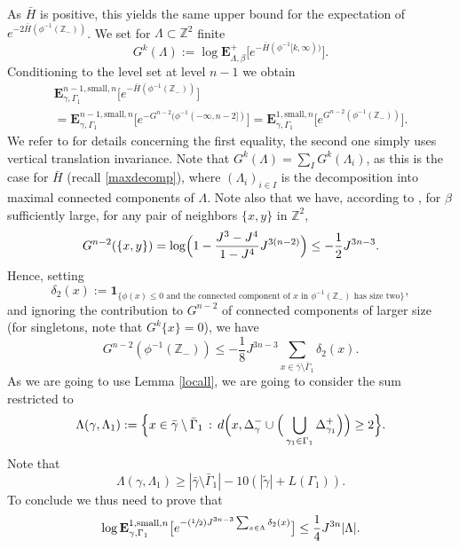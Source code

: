 \documentclass[10pt]{amsart}
\newcommand{\sep}{\,:\,}
\newcommand{\Psfrac}[2]{(\sfrac{#1}{#2})}
\numberwithin{equation}{section}
\theoremstyle{plain}
\theoremstyle{definition}
\newcommand{\sm}{\mathrm{small}}
\newcommand{\ind}{\mathbf{1}}
\newcommand{\bE}{{\ensuremath{\mathbf E}} }
\newcommand{\bbZ}{{\ensuremath{\mathbb Z}} }
\newcommand{\gb}{\beta}
\newcommand{\gG}{\Gamma}
\newcommand{\gL}{\Lambda}
\begin{document}
As $\bar H$ is positive, this yields the same upper bound for the expectation of $e^{-2\bar H(\phi^{-1}(\bbZ_-))}$.
We set for $\gL\subset\bbZ^2$ finite
\begin{equation*}
G^{k}(\gL):= \log \bE^+_{\gL,\gb} \bigl[e^{-\bar H(\phi^{-1}[k,\infty))}\bigr].
\end{equation*}
Conditioning to the level set at level $n-1$ we obtain
\begin{multline*}%
\bE^{n-1,\sm,n}_{\gamma,\gG_1}\bigl[ e^{-\bar H(\phi^{-1}(\bbZ_-))} \bigr]
\\=\bE^{n-1,\sm,n}_{\gamma,\gG_1}\bigl[ e^{-G^{n-2}(\phi^{-1}(-\infty,n-2])} \bigr]=
\bE^{1,\sm,n}_{\gamma,\gG_1}\bigl[ e^{G^{n-2}(\phi^{-1}(\bbZ_-))} \bigr].
\end{multline*}
We refer to \cite[Eq.\,(6.7)]{cf:part1} for details concerning the first equality, the second one simply uses vertical translation invariance.
Note that $G^k(\gL)=\sum_I G^k(\gL_i)$, as this is the case for $\bar H$ (recall \eqref{maxdecomp}), where $(\gL_i)_{i\in I}$ is the decomposition
into maximal connected components of $\gL$.
Note also that we have, according to \cite[Lem.\,6.2]{cf:part1}, for $\gb$ sufficiently large, for any pair of neighbors $\{x,y\}$ in $\bbZ^2$,
\begin{equation*}
G^{n-2}(\{x,y\})=\log \Bigl(1- \frac{J^3-J^4}{1-J^4}J^{3(n-2)} \Bigr)\le -\frac{1}{2}J^{3n-3}.
\end{equation*}
Hence, setting
\begin{equation*}
\delta_2(x):=\ind_{\{\phi(x)\le 0 \text{ and the connected component of $x$ in $\phi^{-1}(\bbZ_-)$ has size two}\}},
\end{equation*}
and ignoring the contribution to $G^{n-2}$ of connected components of larger size (for singletons, note that $G^{k}\{x\}=0$), we have
\begin{equation*}
G^{n-2}(\phi^{-1}(\bbZ_-))\le -\frac{1}{8}J^{3n-3} \sum_{x\in \bar \gamma \setminus \bar \gG_1}\delta_2(x).
\end{equation*}
As we are going to use Lemma \ref{locall}, we are going to consider the sum restricted to
\begin{equation*}
\gL(\gamma,\gL_1):=\Bigl\{ x\in \bar \gamma \setminus \bar \gG_1 \sep d\Bigl(x, \Delta^-_{\gamma}\cup \Big(\bigcup_{\gamma_1\in \gG_1} \Delta^+_{\gamma_1}\Big)\Bigr)\ge 2\Bigr\}.
\end{equation*}
Note that
\begin{equation*}
\gL(\gamma,\gL_1)\ge |\bar \gamma \setminus \bar \gG_1|- 10 \left(|\tilde \gamma| + L(\gG_1) \right).
\end{equation*}
To conclude we thus need to prove that
\begin{equation}\label{zoyer}
\log \bE^{1,\sm,n}_{\gamma,\gG_1}\bigl[ e^{-\Psfrac{1}{2}J^{3n-3} \sum_{x\in \gL}\delta_2(x)} \bigr]\le \frac{1}{4}J^{3n}|\gL|.
\end{equation}
\end{document}
